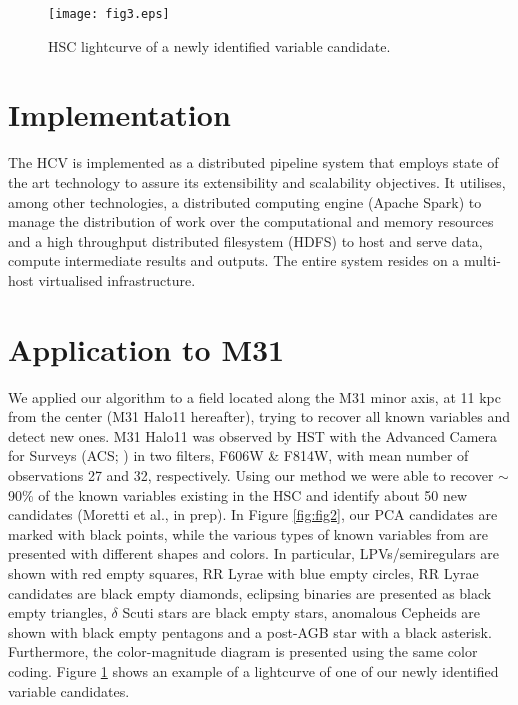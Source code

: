 \documentclass{iau}
\begin{document}
%
\begin{figure}[h]
\begin{center}
 \texttt{[image: fig3.eps]} 
 \caption{ HSC lightcurve of a newly identified variable candidate.}
   \label{fig:fig3}
\end{center}%
\end{figure}
 
\section{Implementation}

The HCV is implemented as a distributed pipeline system that employs state of the art technology to assure its extensibility and scalability objectives. It utilises, among other technologies, a distributed computing engine (Apache Spark) to manage the distribution of work over the computational and memory resources and a high throughput distributed filesystem (HDFS) to host and serve data, compute intermediate results and outputs. The entire system resides on a multi-host virtualised infrastructure.

\section{Application to M31}

We applied our algorithm to a field located along the M31 minor axis, at 11 kpc from the center (M31 Halo11 hereafter), trying to recover all known variables and detect new ones. M31 Halo11 was observed by HST with the Advanced Camera for Surveys (ACS; \cite[Avila et al., 2016]{Avila}) in two filters, F606W \& F814W, with mean number of observations 27 and 32, respectively. Using our method we were able to recover $\sim$90\% of the known variables existing in the HSC and identify about 50 new candidates (Moretti et al., in prep). In Figure \ref{fig:fig2}, our PCA candidates are marked with black points, while the various types of known variables from \cite[Brown et al., (2004)]{Brown} are presented with different shapes and colors. 
In particular, LPVs/semiregulars are shown with red empty squares, RR Lyrae with blue empty circles, RR Lyrae candidates are black empty diamonds, eclipsing binaries are presented as black empty triangles, $\delta$ Scuti stars are black empty stars, anomalous Cepheids are shown with black empty pentagons and a post-AGB star with a black asterisk.
Furthermore, the color-magnitude diagram is presented using the same color coding. Figure \ref{fig:fig3} shows an example of a lightcurve of one of our newly identified variable candidates.
\end{document}
